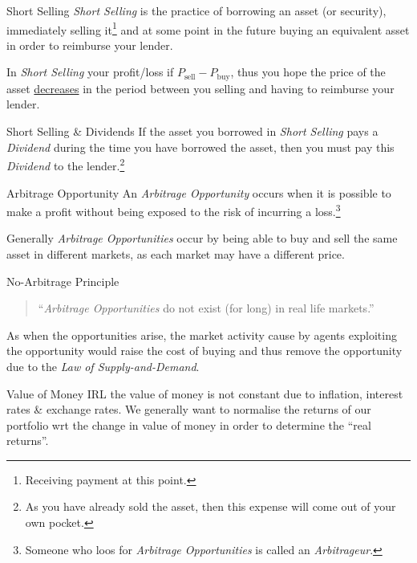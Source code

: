 \documentclass[11pt,a4paper]{article}
\begin{document}
  \begin{definition}{Short Selling}
    \textit{Short Selling} is the practice of borrowing an asset (or security), immediately selling it\footnote{Receiving payment at this point.} and at some point in the future buying an equivalent asset in order to reimburse your lender.
    \par In \textit{Short Selling} your profit/loss if $P_{\text{sell}}-P_{\text{buy}}$, thus you hope the price of the asset \underline{decreases} in the period between you selling and having to reimburse your lender.
  \end{definition}

  \begin{remark}{Short Selling \& Dividends}
    If the asset you borrowed in \textit{Short Selling} pays a \textit{Dividend} during the time you have borrowed the asset, then you must pay this \textit{Dividend} to the lender.\footnote{As you have already sold the asset, then this expense will come out of your own pocket.}
  \end{remark}

  \begin{definition}{Arbitrage Opportunity}
    An \textit{Arbitrage Opportunity} occurs when it is possible to make a profit without being exposed to the risk of incurring a loss.\footnote{Someone who loos for \textit{Arbitrage Opportunities} is called an \textit{Arbitrageur}.}
    \par Generally \textit{Arbitrage Opportunities} occur by being able to buy and sell the same asset in different markets, as each market may have a different price.
  \end{definition}

  \begin{theorem}{No-Arbitrage Principle}
    \begin{quote}
      ``\textit{Arbitrage Opportunities} do not exist (for long) in real life markets.''
    \end{quote}
    As when the opportunities arise, the market activity cause by agents exploiting the opportunity would raise the cost of buying and thus remove the opportunity due to the \textit{Law of Supply-and-Demand}.
  \end{theorem}

  \begin{remark}{Value of Money}
    IRL the value of money is not constant due to inflation, interest rates \& exchange rates. We generally want to normalise the returns of our portfolio wrt the change in value of money in order to determine the ``real returns''.
  \end{remark}
\end{document}
